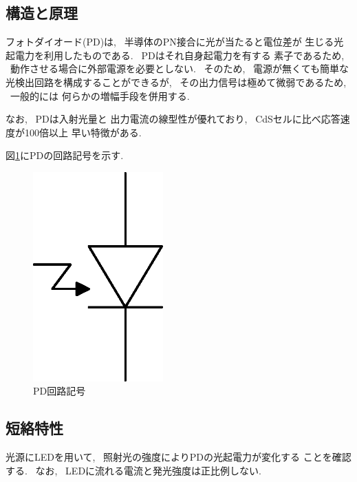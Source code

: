\documentclass[titlepage]{jsarticle}
\begin{document}
    \subsection{構造と原理} \label{フォトダイオード構造と原理}
        フォトダイオード(PD)は, ~半導体のPN接合に光が当たると電位差が
        生じる光起電力を利用したものである. ~PDはそれ自身起電力を有する
        素子であるため, ~動作させる場合に外部電源を必要としない.
        ~そのため, ~電源が無くても簡単な光検出回路を構成することができるが,
        ~その出力信号は極めて微弱であるため, ~一般的には
        何らかの増幅手段を併用する.
        
        なお, ~PDは入射光量と
        出力電流の線型性が優れており, ~CdSセルに比べ応答速度が100倍以上
        早い特徴がある.
        
        図\ref{fig:PD}にPDの回路記号を示す.

        \begin{figure}[ht]
            \centering
            \includegraphics[width=5cm]{images/pd.eps}
            \caption{PD回路記号}
            \label{fig:PD}
        \end{figure}

    \subsection{短絡特性} \label{短絡特性}
        光源にLEDを用いて, ~照射光の強度によりPDの光起電力が変化する
        ことを確認する. ~なお, ~LEDに流れる電流と発光強度は正比例しない.
\end{document}
